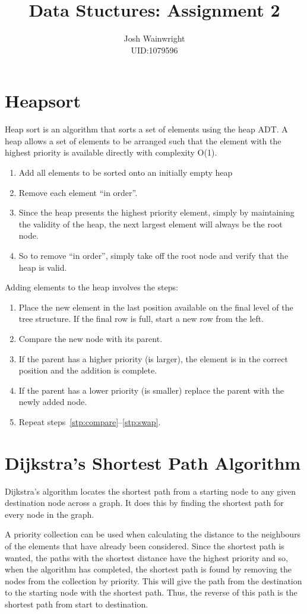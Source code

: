 \documentclass[11pt]{article} %
\author{Josh Wainwright \\ UID:1079596}
\title{Data Stuctures: Assignment 2 }
\date{}
\begin{document}
\maketitle

\section{Heapsort}

Heap sort is an algorithm that sorts a set of elements using the heap ADT.  A
heap allows a set of elements to be arranged such that the element with the
highest priority is available directly with complexity O(1).

\begin{enumerate}
	\item Add all elements to be sorted onto an initially empty heap
	\item Remove each element ``in order''.
	\item Since the heap presents the highest priority element, simply by
		maintaining the validity of the heap, the next largest element will
		always be the root node.
	\item So to remove ``in order'', simply take off the root node and verify
		that the heap is valid.
\end{enumerate}

Adding elements to the heap involves the steps:
\begin{enumerate}
	\item Place the new element in the last position available on the final
		level of the tree structure. If the final row is full, start a new row
		from the left.
	\item Compare the new node with its parent. \label{stp:compare}
	\item If the parent has a higher priority (is larger), the element is in
		the correct position and the addition is complete.
	\item If the parent has a lower priority (is smaller) replace the parent
		with the newly added node. \label{stp:swap}
	\item Repeat steps~\ref{stp:compare}--\ref{stp:swap}.
\end{enumerate}

\section{Dijkstra's Shortest Path Algorithm}

Dijkstra's algorithm locates the shortest path from a starting node to any
given destination node across a graph. It does this by finding the shortest
path for every node in the graph.

A priority collection can be used when calculating the distance to the
neighbours of the elements that have already been considered. Since the
shortest path is wanted, the paths with the shortest distance have the highest
priority and so, when the algorithm has completed, the shortest path is found
by removing the nodes from the collection by priority. This will give the path
from the destination to the starting node with the shortest path. Thus, the
reverse of this path is the shortest path from start to destination.
\end{document}
